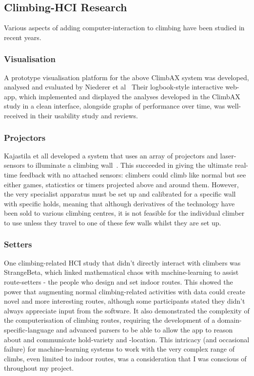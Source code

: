\subsection{Climbing-HCI Research}
Various aspects of adding computer-interaction to climbing have been studied in recent years.

\subsubsection{Visualisation}
A prototype visualisation platform for the above ClimbAX system was developed, analysed and evaluated by Niederer et al~\cite{niederervis}
Their logbook-style interactive web-app, which implemented and displayed the analyses developed in the ClimbAX study in a clean interface, alongside graphs of performance over time, was well-received in their usability study and reviews.

\subsubsection{Projectors}
Kajastila et all developed a system that uses an array of projectors and laser-sensors to illuminate a climbing wall~\cite{projectedclimbwall}.
This succeeded in giving the ultimate real-time feedback with no attached sensors: climbers could climb like normal but see either games, staticstics or timers projected above and around them.
However, the very specialist apparatus must be set up and calibrated for a specific wall with specific holds, meaning that although derivatives of the technology have been sold to various climbing centres, it is not feasible for the individual climber to use unless they travel to one of these few walls whilst they are set up.

\subsubsection{Setters}
One climbing-related HCI study that didn't directly interact with climbers was StrangeBeta\cite{strangebeta}, which linked mathematical chaos with machine-learning to assist route-setters - the people who design and set indoor routes.
This showed the power that augmenting normal climbing-related activities with data could create novel and more interesting routes, although some participants stated they didn't always appreciate input from the software.
It also demonstrated the complexity of the computerisation of climbing routes, requiring the development of a domain-specific-language and advanced parsers to be able to allow the app to reason about and communicate hold-variety and -location.
This intricacy (and occasional failure) for machine-learning systems to work with the very complex range of climbs, even limited to indoor routes, was a consideration that I was conscious of throughout my project.


